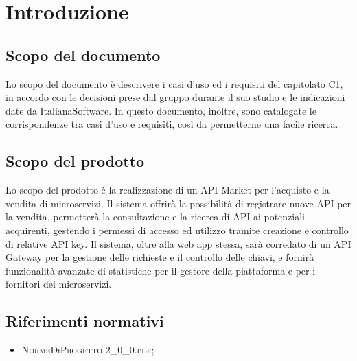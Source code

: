 \newpage
\section{Introduzione}

\subsection{Scopo del documento}
Lo scopo del documento è descrivere i casi d'uso ed i requisiti del capitolato C1, in accordo con le decisioni prese dal gruppo durante il suo studio e le indicazioni date da ItalianaSoftware. In questo documento, inoltre, sono catalogate le corrispondenze tra casi d'uso e requisiti, così da permetterne una facile ricerca.

\subsection{Scopo del prodotto}
Lo scopo del prodotto è la realizzazione di un API Market per l'acquisto e la vendita di microservizi. Il sistema offrirà la possibilità di registrare nuove API per la vendita, permetterà la consultazione e la ricerca di API ai potenziali acquirenti, gestendo i permessi di accesso ed utilizzo tramite creazione e controllo di relative API key. Il sistema, oltre alla web app stessa, sarà corredato di un API Gateway per la gestione delle richieste e il controllo delle chiavi, e fornirà funzionalità avanzate di statistiche per il gestore della piattaforma e per i fornitori dei microservizi.

\subsection{Riferimenti normativi}
\begin{itemize}
	\item \textsc{NormeDiProgetto 2\_0\_0.pdf};
\end{itemize}

